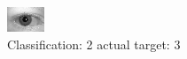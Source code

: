 \begin{figure}[h!]
\begin{center}
\includegraphics[width=0.60\columnwidth]{figures/ID682_class_2_target_3.png}
\end{center}
\caption{ Classification: 2 actual target: 3}
\label{fig:ID682_class_2_target_3}
\end{figure}
